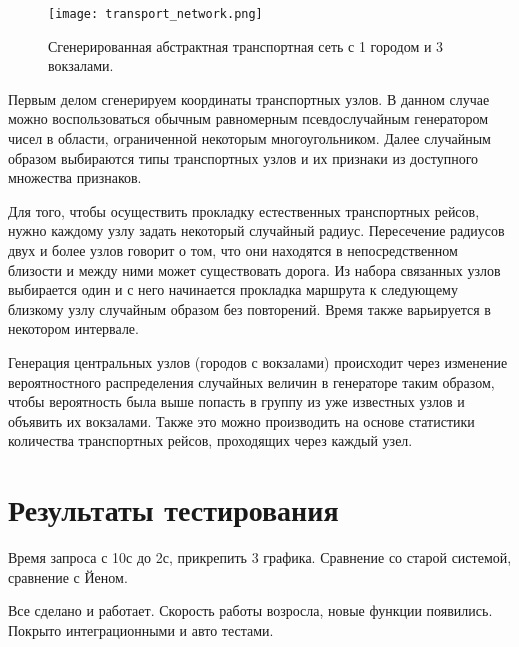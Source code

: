 \begin{figure}[!h]
	\centering
	\texttt{[image: transport\_network.png]}
	\caption{Сгенерированная абстрактная транспортная сеть с 1 городом и 3 вокзалами.}\label{fig12}
\end{figure}

Первым делом сгенерируем координаты транспортных узлов. В данном случае можно воспользоваться обычным равномерным псевдослучайным генератором чисел в области, ограниченной некоторым многоугольником. Далее случайным образом выбираются типы транспортных узлов и их признаки из доступного множества признаков.

Для того, чтобы осуществить прокладку естественных транспортных рейсов, нужно каждому узлу задать некоторый случайный радиус. Пересечение радиусов двух и более узлов говорит о том, что они находятся в непосредственном близости и между ними может существовать дорога. Из набора связанных узлов выбирается один и с него начинается прокладка маршрута к следующему близкому узлу случайным образом без повторений. Время также варьируется в некотором интервале.

Генерация центральных узлов (городов с вокзалами) происходит через изменение вероятностного распределения случайных величин в генераторе таким образом, чтобы вероятность была выше попасть в группу из уже известных узлов и объявить их вокзалами. Также это можно производить на основе статистики количества транспортных рейсов, проходящих через каждый узел.

\FloatBarrier
\section{Результаты тестирования}
Время запроса с 10с до 2с, прикрепить 3 графика. Сравнение со старой системой, сравнение с Йеном.

\chapterconclusion
Все сделано и работает. Скорость работы возросла, новые функции появились. Покрыто интеграционными и авто тестами.
